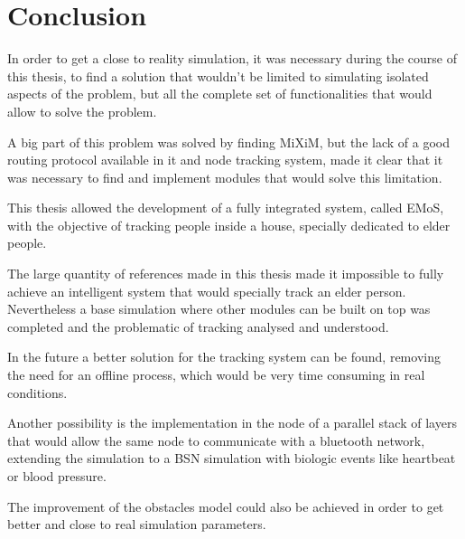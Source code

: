 
\section{Conclusion}
In order to get a close to reality simulation, it was necessary during the course of this thesis, to find a solution that wouldn't be limited to simulating isolated aspects of the problem, but all the complete set of functionalities that would allow to solve the problem.

A big part of this problem was solved by finding MiXiM, but the lack of a good routing protocol available in it and node tracking system, made it clear that it was necessary to find and implement modules that would solve this limitation.

This thesis allowed the development of a fully integrated system, called EMoS, with the objective of tracking people inside a house, specially dedicated to elder people.

The large quantity of references made in this thesis made it impossible to fully achieve an intelligent system that would specially track an elder person. Nevertheless a base simulation where other modules can be built on top was completed and the problematic of tracking analysed and understood.

In the future a better solution for the tracking system can be found, removing the need for an offline process, which would be very time consuming in real conditions.

Another possibility is the implementation in the node of a parallel stack of layers that would allow the same node to communicate with a bluetooth network, extending the simulation to a BSN simulation with biologic events like heartbeat or blood pressure.

The improvement of the obstacles model could also be achieved in order to get better and close to real simulation parameters.


%

